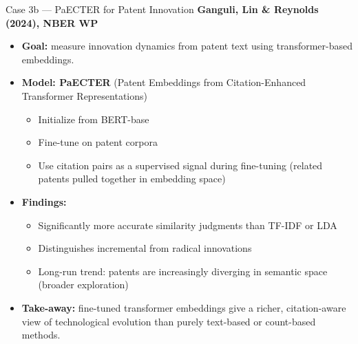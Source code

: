 \documentclass[10pt,english,aspectratio=169]{beamer}
\begin{document}
\begin{frame}{Case 3b --- PaECTER for Patent Innovation}
\textbf{Ganguli, Lin \& Reynolds (2024), NBER WP}

\medskip
\begin{itemize}
\item \textbf{Goal:} measure innovation dynamics from patent text using transformer-based embeddings.

\medskip
\item \textbf{Model: PaECTER} (Patent Embeddings from Citation-Enhanced Transformer Representations)
\begin{itemize}
    \item Initialize from BERT-base
    \item Fine-tune on patent corpora
    \item Use citation pairs as a supervised signal during fine-tuning (related patents pulled together in embedding space)
\end{itemize}

\medskip
\item \textbf{Findings:}
\begin{itemize}
    \item Significantly more accurate similarity judgments than TF-IDF or LDA
    \item Distinguishes incremental from radical innovations
    \item Long-run trend: patents are increasingly diverging in semantic space (broader exploration)
\end{itemize}

\medskip
\item \textbf{Take-away:} fine-tuned transformer embeddings give a richer, citation-aware view of technological evolution than purely text-based or count-based methods.
\end{itemize}
\end{frame}
\end{document}
